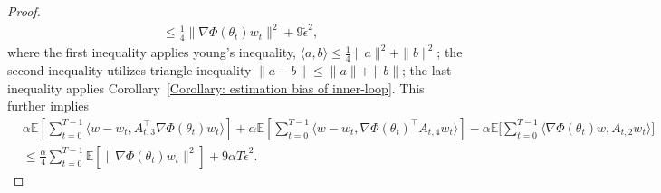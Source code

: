 \documentclass[twoside]{article} %
\def\eqref#1{equation~\ref{#1}}
\theoremstyle{plain}
\theoremstyle{definition}
\theoremstyle{remark}
\newcommand{\tepsilon}{\tilde{\epsilon}}
\newcommand{\calG}{\mathcal{G}}
\newcommand{\calH}{\mathcal{H}}
\begin{document}
\begin{proof}
\begin{align}
    & \leq \frac{1}{4}\|\nabla \Phi(\theta_t)w_t \|^2 + 9\tepsilon^2,
    \label{eq: key insights of algorithm 1}
\end{align}
where the first inequality applies young's inequality, $\langle a,b\rangle\leq \frac{1}{4}\| a\|^2+\|b\|^2$; the second inequality utilizes triangle-inequality $\|a-b\|\leq \|a\|+\|b\|$; the last inequality applies Corollary~\ref{Corollary: estimation bias of inner-loop}. This further implies
\begin{align}
    &\alpha\mathbb{E}[\sum_{t=0}^{T-1}\langle w-w_t, A_{t,3}^{\top}\nabla \Phi(\theta_t)w_t  \rangle]+\alpha \mathbb{E}[\sum_{t=0}^{T-1}\langle w-w_t, \nabla \Phi(\theta_t)^{\top}A_{t,4}w_t \rangle] -\alpha \mathbb{E}\big[\sum_{t=0}^{T-1}\langle \nabla \Phi(\theta_t)w, A_{t,2}w_t \rangle \big] \nonumber\\
    &\leq \frac{\alpha}{4}\sum_{t=0}^{T-1}\mathbb{E}[\|\nabla \Phi(\theta_t)w_t\|^2] + 9\alpha T \tepsilon^2.
    \label{eq: inner product bound 6}
\end{align}

\end{proof}
\end{document}
